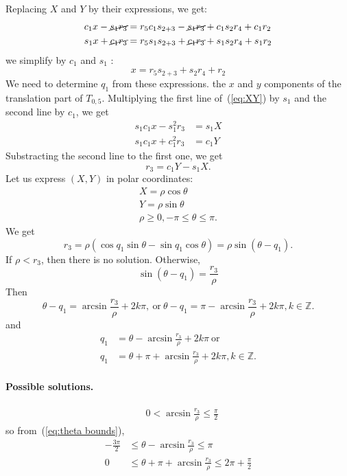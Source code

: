 \documentclass{article}
\begin{document}
Replacing $X$ and $Y$ by their expressions, we get:
\begin{align*}
  c_1x-\cancel{s_1r_3}&=r_5c_1s_{2+3}-\cancel{s_1r_3} +c_1s_2r_4+ c_1r_2\\
  s_1x+\cancel{c_1r_3}&=r_5s_1s_{2+3}+\cancel{c_1r_3}+s_1s_2r_4+s_1r_2\\
\end{align*}
we simplify by $c_1$ and $s_1$ :
\begin{equation}\label{eq:x}
  x=r_5s_{2+3}+s_2r_4+r_2
\end{equation}
We need to determine $q_1$ from these expressions. 
the $x$ and $y$ components of the translation part of $T_{0,5}$. Multiplying the first line of~(\ref{eq:XY}) by $s_1$ and the second line by $c_1$, we get
\begin{align*}
  s_1 c_1 x - s_1^2 r_3 &= s_1 X\\
  s_1 c_1 x + c_1^2 r_3 &= c_1 Y
\end{align*}
Substracting the second line to the first one, we get
$$
r_3 = c_1 Y - s_1 X.
$$
Let us express $(X,Y)$ in polar coordinates:
\begin{align}\label{eq:polar coordinates}
  X = \rho \cos\theta\\
  Y = \rho \sin\theta \\
  \label{eq:theta bounds}
  \rho \geq 0, -\pi \leq \theta \leq \pi.
\end{align}
We get
$$
r_3 = \rho(\cos q_1 \sin\theta - \sin q_1 \cos\theta) = \rho\sin(\theta - q_1).
$$
If $\rho < r_3$, then there is no solution. Otherwise,
$$
\sin(\theta - q_1) = \frac{r_3}{\rho}
$$
Then
$$
\theta - q_1 = \arcsin \frac{r_3}{\rho} + 2k\pi,\ \mbox{or}\ \theta - q_1 = \pi - \arcsin\frac{r_3}{\rho} + 2k\pi, k\in\mathbb{Z}.
$$
and
\begin{align*}
  q_1 &= \theta - \arcsin \frac{r_3}{\rho} + 2k\pi\ \mbox{or}\\
  q_1 &= \theta + \pi + \arcsin\frac{r_3}{\rho} + 2k\pi, k\in\mathbb{Z}.
\end{align*}

\paragraph{Possible solutions.}

\begin{align*}
  &0 < \arcsin \frac{r_3}{\rho} \leq \frac{\pi}{2}
\end{align*}
so from~(\ref{eq:theta bounds}),
\begin{align*}
  -\frac{3\pi}{2} &\leq \theta - \arcsin \frac{r_3}{\rho} \leq \pi\\
   0 & \leq \theta + \pi + \arcsin\frac{r_3}{\rho} \leq 2\pi + \frac{\pi}{2}
\end{align*}
\end{document}
